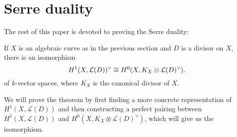 \section{Serre duality}
The rest of this paper is devoted to proving the Serre duality:
\begin{thm}
  If $X$ is an algebraic curve as in the previous section
  and $D$ is a divisor on $X$, there is an isomorphism
  \[
    H^1(X,\mathcal{L}(D))^{\vee}\cong H^{0}(X, K_{X}
    \otimes \mathcal{L}(D)^{\vee}).
  \]
  of $k$-vector spaces, where $K_{X}$ is the canonical divisor of $X$.
\end{thm}
We will prove the theorem by first finding a more concrete representation of
$H^{1}(X,\mathcal{L}(D))$ and then constructing a perfect pairing between
$H^{1}(X,\mathcal{L}(D))$ and $H^{0}(X,K_{X}\otimes\mathcal{L}(D)^{\vee})$,
which will give us the isomorphism.

